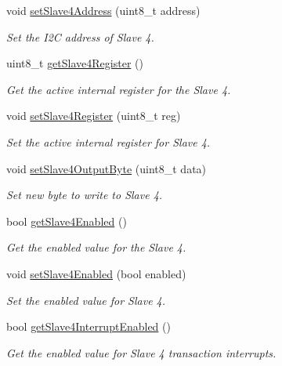 \begin{DoxyCompactItemize}
void \mbox{\hyperlink{classMPU6050_a6985da2cbc37be3fefbe3c16bf8d34a6}{set\+Slave4\+Address}} (uint8\+\_\+t address)
\begin{DoxyCompactList}\small\item\em Set the I2C address of Slave 4. \end{DoxyCompactList}\item 
uint8\+\_\+t \mbox{\hyperlink{classMPU6050_a7bd548cb60ecceb27c72f026ec0a60f8}{get\+Slave4\+Register}} ()
\begin{DoxyCompactList}\small\item\em Get the active internal register for the Slave 4. \end{DoxyCompactList}\item 
void \mbox{\hyperlink{classMPU6050_ae54dc358da048e61a1ac68012300fdaa}{set\+Slave4\+Register}} (uint8\+\_\+t reg)
\begin{DoxyCompactList}\small\item\em Set the active internal register for Slave 4. \end{DoxyCompactList}\item 
void \mbox{\hyperlink{classMPU6050_a17147a6f477be79f58889e9e6329392f}{set\+Slave4\+Output\+Byte}} (uint8\+\_\+t data)
\begin{DoxyCompactList}\small\item\em Set new byte to write to Slave 4. \end{DoxyCompactList}\item 
bool \mbox{\hyperlink{classMPU6050_a4b9e13d6776ba99e042773873557bedd}{get\+Slave4\+Enabled}} ()
\begin{DoxyCompactList}\small\item\em Get the enabled value for the Slave 4. \end{DoxyCompactList}\item 
void \mbox{\hyperlink{classMPU6050_a04be2a8c3af6ef174f97769b9b5164a9}{set\+Slave4\+Enabled}} (bool enabled)
\begin{DoxyCompactList}\small\item\em Set the enabled value for Slave 4. \end{DoxyCompactList}\item 
bool \mbox{\hyperlink{classMPU6050_a051549bcfa2eeb848c8557fc3efe74da}{get\+Slave4\+Interrupt\+Enabled}} ()
\begin{DoxyCompactList}\small\item\em Get the enabled value for Slave 4 transaction interrupts. \end{DoxyCompactList}\item 

\end{DoxyCompactItemize}

